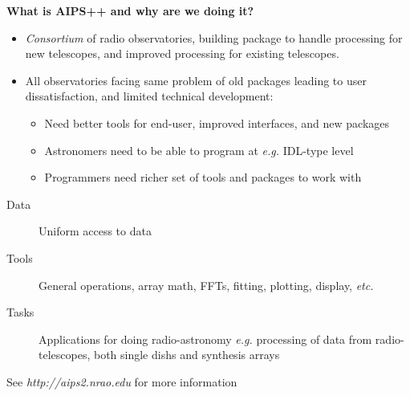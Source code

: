 %



\newenvironment{slide}[1]{\LARGE\begin{center}{\bf #1}\end{center}}{\newpage}
\newenvironment{figlab}[1]{\Large\begin{center}{\bf #1}\end{center}}{\newpage}

\begin{slide}{What is AIPS++ and why are we doing it?}
\begin{itemize}
\item {\em Consortium} of radio observatories, building package
to handle processing for new telescopes, and improved processing
for existing telescopes.
\item All observatories facing same problem of old packages
leading to user dissatisfaction, and limited technical
development:
\begin{itemize}
\item Need better tools for end-user, improved interfaces,
and new packages
\item Astronomers need to be able to program at {\em e.g.}
IDL-type level
\item Programmers need richer set of tools and packages to
work with
\end{itemize}
\end{itemize}
\begin{description}
\item[Data] Uniform access to data
\item[Tools] General operations, array math, FFTs, fitting, plotting,
display, {\em etc.}
\item[Tasks] Applications for doing radio-astronomy {\em e.g.}
processing of data from radio-telescopes, both single dishs and
synthesis arrays
\end{description}
See {\em http://aips2.nrao.edu} for more information
\end{slide}

